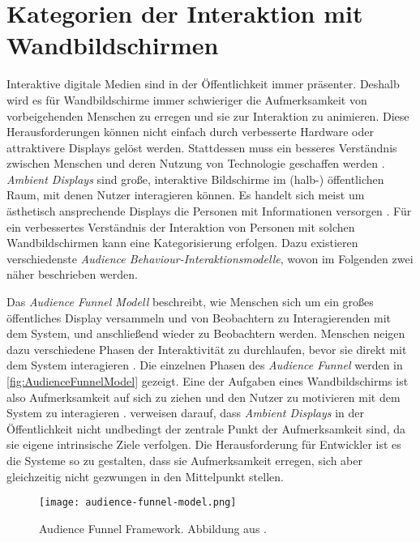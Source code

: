 \section{Kategorien der Interaktion mit Wandbildschirmen}
\label{chapter1-KategorienInteraktion-Wandbildschirme}
Interaktive digitale Medien sind in der Öffentlichkeit immer präsenter.
Deshalb wird es für Wandbildschirme immer schwieriger die Aufmerksamkeit von vorbeigehenden Menschen zu erregen
und sie zur Interaktion zu animieren.
Diese Herausforderungen können nicht einfach durch verbesserte Hardware oder attraktivere Displays gelöst werden.
Stattdessen muss ein besseres Verständnis zwischen Menschen und deren Nutzung von Technologie geschaffen werden \citep{wouters_uncovering_2016}.
\emph{Ambient Displays} sind große, interaktive Bildschirme im (halb-) öffentlichen Raum, mit denen Nutzer interagieren können.
Es handelt sich meist um ästhetisch ansprechende Displays die Personen mit Informationen versorgen \citep{mankoff_heuristic_2003}.
Für ein verbessertes Verständnis der Interaktion von Personen mit solchen Wandbildschirmen kann eine Kategorisierung erfolgen.
Dazu existieren verschiedenste \emph{Audience Behaviour-Interaktionsmodelle}, wovon im Folgenden zwei näher beschrieben werden.

Das \emph{Audience Funnel Modell} beschreibt, wie Menschen sich um ein großes öffentliches Display versammeln
und von Beobachtern zu Interagierenden mit dem System, und anschließend wieder zu Beobachtern werden.
Menschen neigen dazu verschiedene Phasen der Interaktivität zu durchlaufen,
bevor sie direkt mit dem System interagieren \citep{wouters_uncovering_2016, mai_audience_2018}.
Die einzelnen Phasen des \emph{Audience Funnel} werden in \autoref{fig:AudienceFunnelModel} gezeigt.
Eine der Aufgaben eines Wandbildschirms ist also Aufmerksamkeit auf sich zu ziehen
und den Nutzer zu motivieren mit dem System zu interagieren \citep{mai_audience_2018}.
\citet{mai_audience_2018} verweisen darauf, dass \emph{Ambient Displays} in der Öffentlichkeit
nicht undbedingt der zentrale Punkt der Aufmerksamkeit sind, da sie eigene intrinsische Ziele verfolgen.
Die Herausforderung für Entwickler ist es die Systeme so zu gestalten,
dass sie Aufmerksamkeit erregen, sich aber gleichzeitig nicht gezwungen in den Mittelpunkt stellen.

\begin{figure}[ht]
    \begin{center}
    \texttt{[image: audience-funnel-model.png]}
    \end{center}
    \caption{Audience Funnel Framework. Abbildung aus \citet{mai_audience_2018}.}
    \label{fig:AudienceFunnelModel}
  \end{figure}


